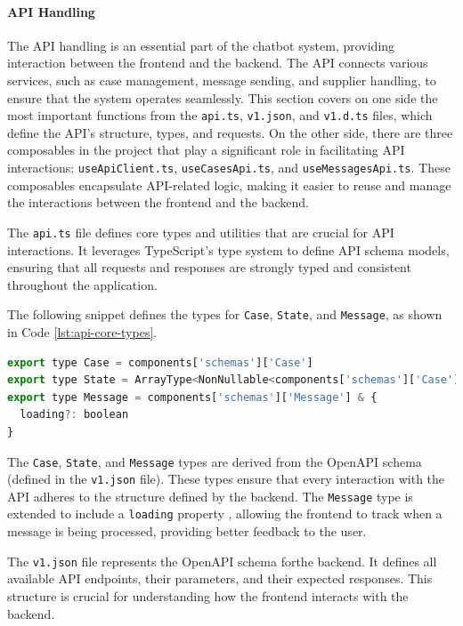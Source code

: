 \paragraph{API Handling}

The \ac{API} handling is an essential part of the chatbot system, providing interaction between the frontend and the
backend. The \ac{API} connects various services, such as case management, message sending, and supplier handling, to
ensure that the system operates seamlessly. This section covers on one side the most important functions from the
\texttt{api.ts}, \texttt{v1.json}, and \texttt{v1.d.ts} files, which define the \ac{API}'s structure, types, and
requests. On the other side, there are three composables in the project that play a significant role in facilitating
\ac{API} interactions: \texttt{useApiClient.ts}, \texttt{useCasesApi.ts}, and \texttt{useMessagesApi.ts}. These
composables encapsulate \ac{API}-related logic, making it easier to reuse and manage the interactions between the
frontend and the backend.

The \texttt{api.ts}
file defines core types and utilities that are crucial for \ac{API} interactions. It leverages TypeScript's type system
to define \ac{API} schema models, ensuring that all requests and responses are strongly typed and consistent throughout
the application.

The following snippet defines the types for \texttt{Case}, \texttt{State}, and \texttt{Message}, as shown in Code
\ref{lst:api-core-types}.

\begin{lstlisting}[language=JavaScript, caption={Core API Types (\texttt{api.ts})},
  firstnumber=1,label={lst:api-core-types}]
export type Case = components['schemas']['Case']
export type State = ArrayType<NonNullable<components['schemas']['Case']['state']>>
export type Message = components['schemas']['Message'] & {
  loading?: boolean
}
\end{lstlisting}

The \texttt{Case}, \texttt{State}, and \texttt{Message} types are derived from the OpenAPI schema (defined in the
\texttt{v1.json} file). These types ensure that every interaction with the \ac{API} adheres to the structure
defined by the backend. The \texttt{Message} type is extended to include a \texttt{loading} property
, allowing the frontend to track when a message is being processed, providing better feedback to the user.

The \texttt{v1.json} file represents the OpenAPI schema forthe backend. It defines all available \ac{API} endpoints,
their parameters, and their expected responses. This structure is crucial for understanding how the frontend interacts
with the backend.

